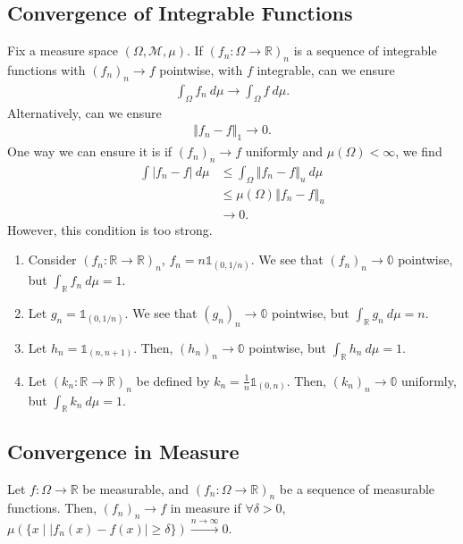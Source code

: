 \documentclass[9pt]{extarticle}
\newcommand{\R}{\mathbb{R}}
\newcommand{\norm}[1]{\left\Vert #1 \right\Vert}
\begin{document}
  \subsection{Convergence of Integrable Functions}%
  Fix a measure space $(\Omega,\mathcal{M},\mu)$. If $\left(f_n:\Omega \rightarrow \R\right)_{n}$ is a sequence of integrable functions with $(f_n)_n\rightarrow f$ pointwise, with $f$ integrable, can we ensure
  \begin{align*}
    \int_{\Omega}f_n~d\mu \rightarrow \int_{\Omega}f~d\mu.
  \end{align*}
  Alternatively, can we ensure
  \begin{align*}
    \norm{f_n - f}_1 \rightarrow 0.
  \end{align*}
  One way we can ensure it is if $(f_n)_n\rightarrow f$ uniformly and $\mu(\Omega) < \infty$, we find
  \begin{align*}
    \int|f_n - f|~d\mu &\leq \int_{\Omega}\norm{f_n - f}_{u}~d\mu\\
                       &\leq \mu(\Omega)\norm{f_n - f}_{u}\\
                       &\rightarrow 0.
  \end{align*}
  However, this condition is too strong.
  \begin{enumerate}[(1)]
    \item Consider $\left(f_n: \R\rightarrow \R\right)_{n}$, $f_n = n\mathbb{1}_{(0,1/n)}$. We see that $(f_n)_n\rightarrow \mathbb{0}$ pointwise, but $\int_{\R} f_n~d\mu = 1$.
    \item Let $g_n = \mathbb{1}_{(0,1/n)}$. We see that $(g_n)_n\rightarrow \mathbb{0}$ pointwise, but $\int_{\R}g_n~d\mu = n$.
    \item Let $h_n = \mathbb{1}_{(n,n+1)}$. Then, $(h_n)_n\rightarrow \mathbb{0}$ pointwise, but $\int_{\R}h_n~d\mu = 1$.
    \item Let $\left(k_n: \R\rightarrow \R\right)_n$ be defined by $k_n = \frac{1}{n}\mathbb{1}_{(0,n)}$. Then, $(k_n)_n\rightarrow \mathbb{0}$ uniformly, but $\int_{\R}k_n~d\mu = 1$.
  \end{enumerate}
  \subsection{Convergence in Measure}%
  Let  $f: \Omega \rightarrow \R$ be measurable, and $\left(f_n: \Omega \rightarrow \R\right)_{n}$ be a sequence of measurable functions. Then, $(f_n)_n \rightarrow f$ in measure if $\forall \delta > 0$, $\mu \left(\{x\mid |f_n(x) - f(x)| \geq \delta\}\right) \xrightarrow{n\rightarrow\infty} 0$.\\
\end{document}
